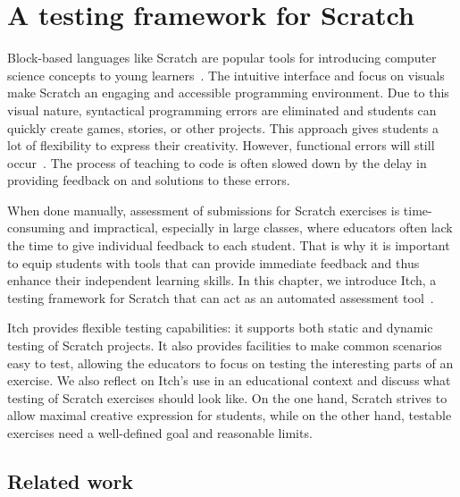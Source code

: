 \documentclass[../main]{subfiles}
\begin{document}
\chapter{A testing framework for Scratch}\label{ch:itch}


Block-based languages like Scratch are popular tools for introducing computer science concepts to young learners~\autocite{bauLearnableProgrammingBlocks2017,zhangSystematicReviewLearning2019}.
The intuitive interface and focus on visuals make Scratch an engaging and accessible programming environment.
Due to this visual nature, syntactical programming errors are eliminated and students can quickly create games, stories, or other projects.
This approach gives students a lot of flexibility to express their creativity.
However, functional errors will still occur~\autocite{zellerWhyProgramsFail2009}.
The process of teaching to code is often slowed down by the delay in providing feedback on and solutions to these errors.

When done manually, assessment of submissions for Scratch exercises is time-consuming and impractical, especially in large classes, where educators often lack the time to give individual feedback to each student.
That is why it is important to equip students with tools that can provide immediate feedback and thus enhance their independent learning skills.
In this chapter, we introduce Itch, a testing framework for Scratch that can act as an automated assessment tool~\autocite{douceAutomaticTestbasedAssessment2005}.

Itch provides flexible testing capabilities: it supports both static and dynamic testing of Scratch projects.
It also provides facilities to make common scenarios easy to test, allowing the educators to focus on testing the interesting parts of an exercise.
We also reflect on Itch's use in an educational context and discuss what testing of Scratch exercises should look like.
On the one hand, Scratch strives to allow maximal creative expression for students, while on the other hand, testable exercises need a well-defined goal and reasonable limits.

\section{Related work}\label{sec:related-work}
\end{document}

